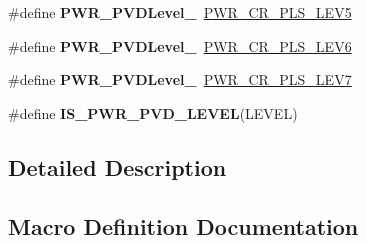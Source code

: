 \begin{DoxyCompactItemize}
\item 
\hypertarget{group___p_w_r___p_v_d__detection__level_ga0dfeb8ca4a8cb68dd99b1fe087c9440a}{}\#define {\bfseries P\+W\+R\+\_\+\+P\+V\+D\+Level\+\_}~\hyperlink{group___peripheral___registers___bits___definition_ga326781d09a07b4d215424fbbae11b7b2}{P\+W\+R\+\_\+\+C\+R\+\_\+\+P\+L\+S\+\_\+\+L\+E\+V5}\label{group___p_w_r___p_v_d__detection__level_ga0dfeb8ca4a8cb68dd99b1fe087c9440a}

\item 
\hypertarget{group___p_w_r___p_v_d__detection__level_gaf52c143ded625cd4d4f06a5954b55af4}{}\#define {\bfseries P\+W\+R\+\_\+\+P\+V\+D\+Level\+\_}~\hyperlink{group___peripheral___registers___bits___definition_gaaff17e9c7fe7d837523b1e9a2f4e9baf}{P\+W\+R\+\_\+\+C\+R\+\_\+\+P\+L\+S\+\_\+\+L\+E\+V6}\label{group___p_w_r___p_v_d__detection__level_gaf52c143ded625cd4d4f06a5954b55af4}

\item 
\hypertarget{group___p_w_r___p_v_d__detection__level_ga53439278c8f3a05b810b43fc3ad79f7b}{}\#define {\bfseries P\+W\+R\+\_\+\+P\+V\+D\+Level\+\_}~\hyperlink{group___peripheral___registers___bits___definition_ga95e3b301b5470ae94d32c53a9fbdfc8b}{P\+W\+R\+\_\+\+C\+R\+\_\+\+P\+L\+S\+\_\+\+L\+E\+V7}\label{group___p_w_r___p_v_d__detection__level_ga53439278c8f3a05b810b43fc3ad79f7b}

\item 
\#define {\bfseries I\+S\+\_\+\+P\+W\+R\+\_\+\+P\+V\+D\+\_\+\+L\+E\+V\+E\+L}(L\+E\+V\+E\+L)
\end{DoxyCompactItemize}


\subsection{Detailed Description}


\subsection{Macro Definition Documentation}
\hypertarget{group___p_w_r___p_v_d__detection__level_gabac4485a57abc97aad91eaa0b65ae927}{}

